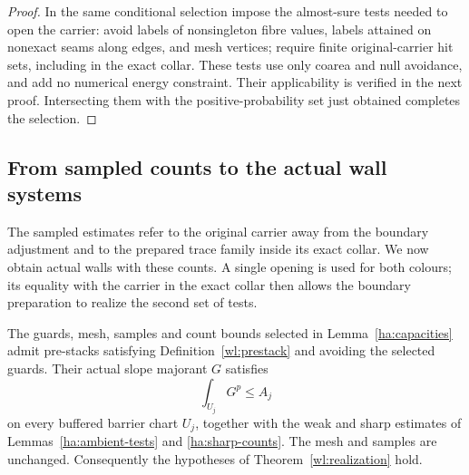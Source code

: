 \begin{proof}
In the same conditional selection impose the almost-sure tests
needed to open the carrier: avoid labels of nonsingleton fibre
values, labels attained on nonexact seams along edges, and mesh
vertices; require finite original-carrier hit sets, including in
the exact collar.  These tests use only coarea and null avoidance,
and add no numerical energy constraint.  Their applicability is
verified in the next proof.  Intersecting them with the
positive-probability set just obtained completes the selection.
\end{proof}

\subsection{From sampled counts to the actual wall systems}
\label{ha:wall-transfer}

The sampled estimates refer to the original carrier away from the
boundary adjustment and to the prepared trace family inside its
exact collar.  We now obtain actual walls with these counts.  A
single opening is used for both colours; its equality with the
carrier in the exact collar then allows the boundary preparation
to realize the second set of tests.

\begin{proposition}
\label{ha:initial-walls}
The guards, mesh, samples and count bounds selected in
Lemma~\ref{ha:capacities} admit pre-stacks satisfying
Definition~\ref{wl:prestack} and avoiding the selected guards.
Their actual slope majorant $G$ satisfies
\[
                         \int_{U_j}G^p\le A_j
\]
on every buffered barrier chart $U_j$, together with the weak and
sharp estimates of Lemmas~\ref{ha:ambient-tests} and
\ref{ha:sharp-counts}.  The mesh and samples are unchanged.
Consequently the hypotheses of Theorem~\ref{wl:realization} hold.
\end{proposition}

